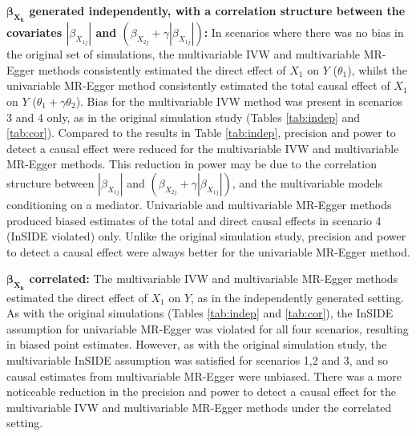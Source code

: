 \documentclass[a4paper,12pt]{article}
\begin{document}
{\begin{bibunit}[wileyj]
{\textbf{$\boldsymbol{\beta_{X_{k}}}$ generated independently, with a correlation structure between the covariates $|\beta_{X_{1j}}|$ and $(\beta_{X_{2j}} + \gamma|\beta_{X_{1j}}|)$:} In scenarios where there was no bias in the original set of simulations, the multivariable IVW and multivariable MR-Egger methods consistently estimated the direct effect of $X_1$ on $Y$ ($\theta_1$), whilst the univariable MR-Egger method consistently estimated the total causal effect of $X_1$ on $Y$ ($\theta_1 + \gamma\theta_2$). Bias for the multivariable IVW method was present in scenarios 3 and 4 only, as in the original simulation study (Tables \ref{tab:indep} and \ref{tab:cor}). Compared to the results in Table \ref{tab:indep}, precision and power to detect a causal effect were reduced for the multivariable IVW and multivariable MR-Egger methods. This reduction in power may be due to the correlation structure between $|\beta_{X_{1j}}|$ and $(\beta_{X_{2j}} + \gamma|\beta_{X_{1j}}|)$, and the multivariable models conditioning on a mediator. Univariable and multivariable MR-Egger methods produced biased estimates of the total and direct causal effects in scenario 4 (InSIDE violated) only.  Unlike the original simulation study, precision and power to detect a causal effect were always better for the univariable MR-Egger method.  

\textbf{$\boldsymbol{\beta_{X_{k}}}$ correlated:} The multivariable IVW and multivariable MR-Egger methods estimated the direct effect of $X_1$ on $Y$, as in the independently generated setting. As with the original simulations (Tables \ref{tab:indep} and \ref{tab:cor}), the InSIDE assumption for univariable MR-Egger was violated for all four scenarios, resulting in biased point estimates.  However, as with the original simulation study, the multivariable InSIDE assumption was satisfied for scenarios 1,2 and 3, and so causal estimates from multivariable MR-Egger were unbiased. There was a more noticeable reduction in the precision and power to detect a causal effect for the multivariable IVW and multivariable MR-Egger methods under the correlated setting.  }


\end{bibunit}}
\end{document}
